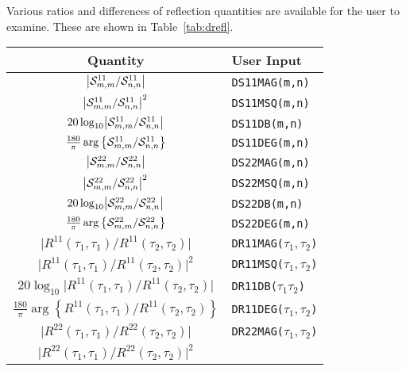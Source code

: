 \documentclass[11pt]{article}
\renewcommand{\abs}[1]{\bigl\lvert#1\bigr\rvert}
\begin{document}
Various ratios and differences of reflection quantities are
available for the user to examine. These are shown in Table~\ref{tab:drefl}.
\begin{table}[htbp]
  \begin{center}
    \renewcommand{\arraystretch}{1.3}
    \begin{tabular}{|c|l|} \hline
      \bfseries Quantity & \bfseries User Input \\ \hline \hline
      $\abs{\matel{S}^{11}_{m,m} / \matel{S}^{11}_{n,n}}$ & 
      \verb_DS11MAG(m,n)_ \\ \hline
      $\abs{\matel{S}^{11}_{m,m} / \matel{S}^{11}_{n,n}}^2$ & 
      \verb_DS11MSQ(m,n)_ \\ \hline
      $20\log_{10}\abs{\matel{S}^{11}_{m,m}/\matel{S}^{11}_{n,n}}$ & 
      \verb_DS11DB(m,n)_ \\ \hline
      $\frac{180}{\pi}\arg\left\{\mathcal{S}^{11}_{m,m} /
        \mathcal{S}^{11}_{n,n}\right\}$
      & \verb_DS11DEG(m,n)_   \\ \hline
      $\abs{\matel{S}^{22}_{m,m}/\matel{S}^{22}_{n,n}}$ & 
      \verb_DS22MAG(m,n)_ \\ \hline
      $\abs{\matel{S}^{22}_{m,m}/\matel{S}^{22}_{n,n}}^2$ & 
      \verb_DS22MSQ(m,n)_ \\ \hline
      $20\log_{10}\abs{\matel{S}^{22}_{m,m}/\matel{S}^{22}_{n,n}}$ & 
      \verb_DS22DB(m,n)_ \\ \hline
      $\frac{180}{\pi}\arg\left\{\mathcal{S}^{22}_{m,m} / 
        \mathcal{S}^{22}_{n,n}\right\}$
      & \verb_DS22DEG(m,n)_   \\ \hline
      $\abs{R^{11}(\tau_1,\tau_1) / 
        R^{11}(\tau_2,\tau_2)}$ & 
      \verb_DR11MAG(_$\tau_1,\tau_2$\verb_)_ \\ \hline
      $\abs{R^{11}(\tau_1,\tau_1) /
        R^{11}(\tau_2,\tau_2)}^2$ & 
      \verb_DR11MSQ(_$\tau_1,\tau_2$\verb_)_ \\ \hline
      $20\log_{10}\abs{R^{11}(\tau_1,\tau_1) / 
        R^{11}(\tau_2,\tau_2)}$ & 
      \verb_DR11DB(_$\tau_1\tau_2$\verb_)_ \\ \hline
      $\frac{180}{\pi}\arg\left\{R^{11}(\tau_1,\tau_1) / 
        R^{11}(\tau_2,\tau_2)\right\}$ & 
        \verb_DR11DEG(_$\tau_1,\tau_2$\verb_)_ \\ \hline
      $\abs{R^{22}(\tau_1,\tau_1) / 
        R^{22}(\tau_2,\tau_2)}$ & 
        \verb_DR22MAG(_$\tau_1,\tau_2$\verb_)_ \\ \hline
        $\abs{R^{22}(\tau_1,\tau_1) / 
          R^{22}(\tau_2,\tau_2)}^2$ & 

\end{tabular}
\end{center}
\end{table}
\end{document}
